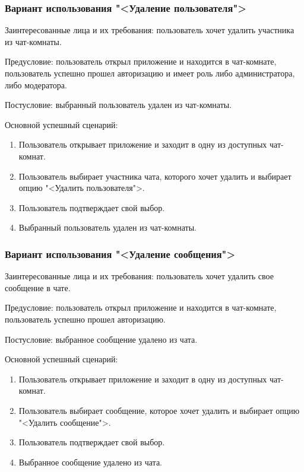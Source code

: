 \subsubsection{Вариант использования "<Удаление пользователя">}

Заинтересованные лица и их требования: пользователь хочет удалить участника из чат-комнаты.

Предусловие: пользователь открыл приложение и находится в чат-комнате, пользователь успешно прошел авторизацию и имеет роль либо администратора, либо модератора.

Постусловие: выбранный пользователь удален из чат-комнаты.

Основной успешный сценарий:

\begin{enumerate}
	\item Пользователь открывает приложение и заходит в одну из доступных чат-комнат.
	\item Пользователь выбирает участника чата, которого хочет удалить и выбирает опцию "<Удалить пользователя">.
	\item Пользователь подтверждает свой выбор.
	\item Выбранный пользователь удален из чат-комнаты.
\end{enumerate}

\subsubsection{Вариант использования "<Удаление сообщения">}

Заинтересованные лица и их требования: пользователь хочет удалить свое сообщение в чате.

Предусловие: пользователь открыл приложение и находится в чат-комнате, пользователь успешно прошел авторизацию.

Постусловие: выбранное сообщение удалено из чата.

Основной успешный сценарий:

\begin{enumerate}
	\item Пользователь открывает приложение и заходит в одну из доступных чат-комнат.
	\item Пользователь выбирает сообщение, которое хочет удалить и выбирает опцию "<Удалить сообщение">.
	\item Пользователь подтверждает свой выбор.
	\item Выбранное сообщение удалено из чата.
\end{enumerate}

